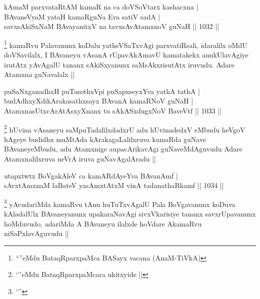 
\begin{shl}
kAmaM parxvataRtAM kamaR na ca doVSoV\s tarx kashacxna | \\
BAvaneVyaM yataH kamaRguNa Eva satiV sadA | \\
savxsAkiSxNaM BAvayanitxV na tavxsAvAtamxnoV guNaH \hfill||  1032 ||  
\end{shl}

\begin{artha}
\footnote{``\stext''eMdu BataqRparxpaMca BASayx vacana (AnaM-TiVkA)}
kamaRvu Palavanunx koDalu yatheVSaTxvAgi parxvatiRsali, idaralilx oMdU doVSavilalx, I BAvaneyu vAsanA rUpavAkAmavU kamatakekx anukUlavAgiye irutAtx yAvAgalU tananx sAkiSxyanunx saMsAkxrisutAtx iruvudu. Adare Atamxna guNavalalx || 
\end{artha}

\begin{shl}
puSaNxganadhxH puTasothxV\s pi puSapxseyxYva yathA tathA | \\
budAdhxyXdikArakasathxsayx BAvanA kamaRNoV guNaH | \\
AtamxnasUtxcArAtAsxyXnanx tu sAkASxdugxNoV BaveVtf \hfill||  1033 || 
\end{shl}

\begin{artha}
\footnote{`\stext''eMdu BataqRparxpaMcara ukitxyide ||}
hUvina vAsaneyu saMpuTadalilxdadxrU adu hUvinadedxV eMbudu heVgoV hAgeye budidhx muMtAda kArakagaLalilxruva kamaRda guNave BAvaneyeMbudu, adu Atamxnige aupacArikavAgi guNaveMdAguvudu Adare Atamxnalilxruva neVrA iruva guNavAgalAradu ||
\end{artha}


\begin{shl}
utapxtwtx BoVgakAleV ca kamAR\s \s dAyeYva BAvanAmf | \\
sAvxtAmxnaM laBateV yasAmxtAtxM vinA tadanathaRkamf \hfill||  1034 ||  
\end{shl}

\begin{artha}
\footnote{`\stext''}
yAvudariMda kamaRvu tAnu huTuTxvAgalU Pala BoVgavanunx koDuva kAladalUlx BAvaneyanunx upakaraNavAgi sivxVkarisiye tananx savxrUpavanunx hoMduvudo, adariMda A BAvaneyu ilalxde hoVdare AkamaRvu niSaPxlavAguvudu ||
\end{artha}

